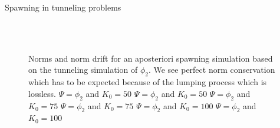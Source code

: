 \begin{chapter}{Spawning in tunneling problems}
\begin{figure}[h!]
{  } \\
   \\
  \caption[Norms and norm drift for an aposteriori spawning simulation with lumping]{
  Norms and norm drift for an aposteriori spawning simulation based on the tunneling
  simulation of $\phi_2$. We see perfect norm conservation which has to be expected
  because of the lumping process which is lossless.
   $\Psi = \phi_2$ and $K_0=50$
   $\Psi = \phi_2$ and $K_0=50$
   $\Psi = \phi_2$ and $K_0=75$
   $\Psi = \phi_2$ and $K_0=75$
   $\Psi = \phi_2$ and $K_0=100$
   $\Psi = \phi_2$ and $K_0=100$
  \label{fig:spawn_eckart_apost_phi2_norms}
  }
\end{figure}



\end{chapter}
